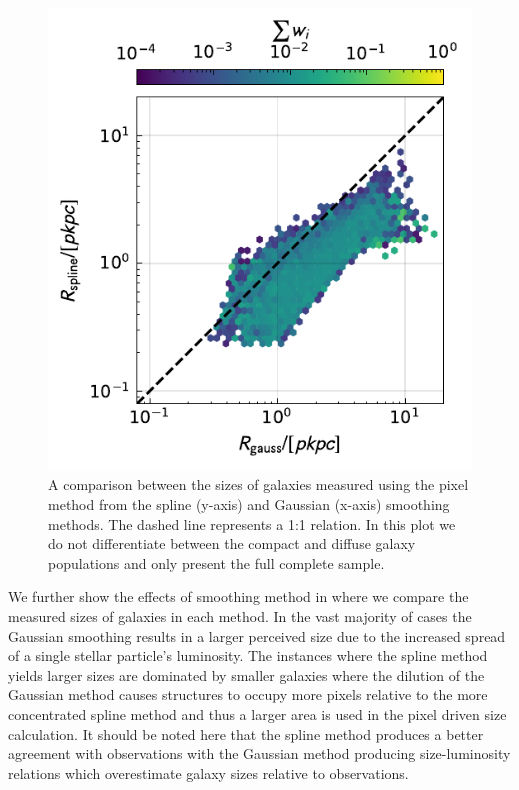 \begin{figure}
	\includegraphics[width=\columnwidth]{Figures/ComparisonImageCreation_HLR_FAKE.TH.FUV_5.0_sim_Total_default.pdf}
    \caption{A comparison between the sizes of galaxies measured using the pixel method from the spline (y-axis) and Gaussian (x-axis) smoothing methods. The dashed line represents a 1:1 relation. In this plot we do not differentiate between the compact and diffuse galaxy populations and only present the full complete sample.}
    \label{fig:imgtypehlr}
\end{figure}

We further show the effects of smoothing method in  where we compare the measured sizes of galaxies in each method. In the vast majority of cases the Gaussian smoothing results in a larger perceived size due to the increased spread of a single stellar particle's luminosity. The instances where the spline method yields larger sizes are dominated by smaller galaxies where the dilution of the Gaussian method causes structures to occupy more pixels relative to the more concentrated spline method and thus a larger area is used in the pixel driven size calculation. It should be noted here that the spline method produces a better agreement with observations with the Gaussian method producing size-luminosity relations which overestimate galaxy sizes relative to observations.

